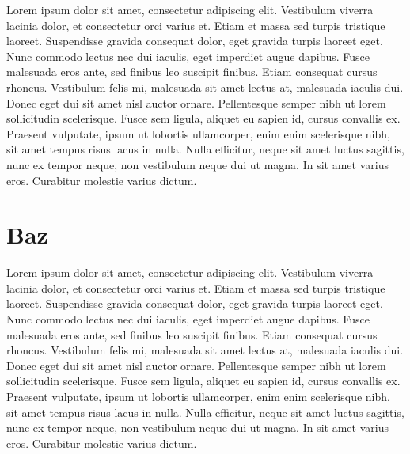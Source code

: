 Lorem ipsum dolor sit amet, consectetur adipiscing elit. Vestibulum viverra
lacinia dolor, et consectetur orci varius et. Etiam et massa sed turpis
tristique laoreet. Suspendisse gravida consequat dolor, eget gravida turpis
laoreet eget. Nunc commodo lectus nec dui iaculis, eget imperdiet augue dapibus.
Fusce malesuada eros ante, sed finibus leo suscipit finibus. Etiam consequat
cursus rhoncus. Vestibulum felis mi, malesuada sit amet lectus at, malesuada
iaculis dui. Donec eget dui sit amet nisl auctor ornare. Pellentesque semper
nibh ut lorem sollicitudin scelerisque. Fusce sem ligula, aliquet eu sapien id,
cursus convallis ex. Praesent vulputate, ipsum ut lobortis ullamcorper, enim
enim scelerisque nibh, sit amet tempus risus lacus in nulla. Nulla efficitur,
neque sit amet luctus sagittis, nunc ex tempor neque, non vestibulum neque dui
ut magna. In sit amet varius eros. Curabitur molestie varius dictum.

\chapter{Baz}

Lorem ipsum dolor sit amet, consectetur adipiscing elit. Vestibulum viverra
lacinia dolor, et consectetur orci varius et. Etiam et massa sed turpis
tristique laoreet. Suspendisse gravida consequat dolor, eget gravida turpis
laoreet eget. Nunc commodo lectus nec dui iaculis, eget imperdiet augue dapibus.
Fusce malesuada eros ante, sed finibus leo suscipit finibus. Etiam consequat
cursus rhoncus. Vestibulum felis mi, malesuada sit amet lectus at, malesuada
iaculis dui. Donec eget dui sit amet nisl auctor ornare. Pellentesque semper
nibh ut lorem sollicitudin scelerisque. Fusce sem ligula, aliquet eu sapien id,
cursus convallis ex. Praesent vulputate, ipsum ut lobortis ullamcorper, enim
enim scelerisque nibh, sit amet tempus risus lacus in nulla. Nulla efficitur,
neque sit amet luctus sagittis, nunc ex tempor neque, non vestibulum neque dui
ut magna. In sit amet varius eros. Curabitur molestie varius dictum.

